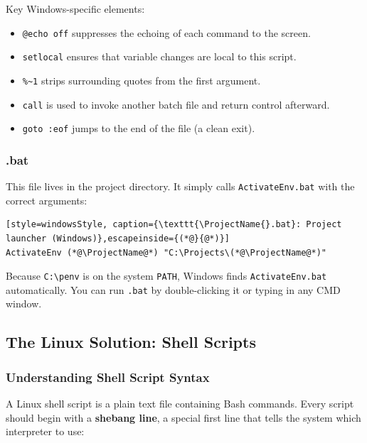 Key Windows-specific elements:
\begin{itemize}
  \item \texttt{@echo off} suppresses the echoing of each command to the
        screen.
  \item \texttt{setlocal} ensures that variable changes are local to this
        script.
  \item \texttt{\%\textasciitilde1} strips surrounding quotes from the first
        argument.
  \item \texttt{call} is used to invoke another batch file and return
        control afterward.
  \item \texttt{goto :eof} jumps to the end of the file (a clean exit).
\end{itemize}

\subsubsection{\ProjectName{}.bat}

This file lives in the \ProjectName{} project directory. It simply calls
\texttt{ActivateEnv.bat} with the correct arguments:

\begin{lstlisting}[style=windowsStyle, caption={\texttt{\ProjectName{}.bat}: Project launcher (Windows)},escapeinside={(*@}{@*)}]
ActivateEnv (*@\ProjectName@*) "C:\Projects\(*@\ProjectName@*)"
\end{lstlisting}

Because \texttt{C:\textbackslash penv} is on the system \texttt{PATH},
Windows finds \texttt{ActivateEnv.bat} automatically. You can run
\texttt{\ProjectName{}.bat} by double-clicking it or typing \texttt{\ProjectName{}} in any
CMD window.

\subsection{The Linux Solution: Shell Scripts}
\label{subsec:linux-scripts}

\subsubsection{Understanding Shell Script Syntax}

A Linux shell script is a plain text file containing Bash commands. Every
script should begin with a \textbf{shebang line}, a special first line that
tells the system which interpreter to use:

